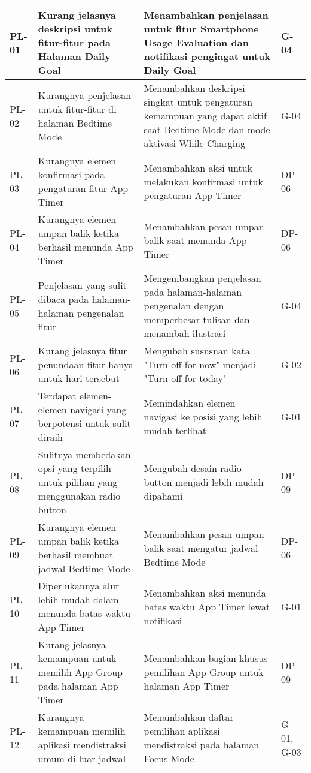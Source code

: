 \begin{footnotesize}
\begin{longtable}[c]{|W{c}{0.06\textwidth}|>{\ccnormspacing}m{0.32\textwidth}|>{\ccnormspacing}m{0.35\textwidth}|>{\ccnormspacingcenter}m{0.14\textwidth}|}
  PL-01 & Kurang jelasnya deskripsi untuk fitur-fitur pada Halaman Daily Goal & Menambahkan penjelasan untuk fitur Smartphone Usage Evaluation dan notifikasi pengingat untuk Daily Goal & G-04 \\ \hline
  PL-02 & Kurangnya penjelasan untuk fitur-fitur di halaman Bedtime Mode & Menambahkan deskripsi singkat untuk pengaturan kemampuan yang dapat aktif saat Bedtime Mode dan mode aktivasi While Charging & G-04 \\ \hline
  PL-03 & Kurangnya elemen konfirmasi pada pengaturan fitur App Timer & Menambahkan aksi untuk melakukan konfirmasi untuk pengaturan App Timer & DP-06 \\ \hline
  PL-04 & Kurangnya elemen umpan balik ketika berhasil menunda App Timer & Menambahkan pesan umpan balik saat menunda App Timer & DP-06 \\ \hline
  PL-05 & Penjelasan yang sulit dibaca pada halaman-halaman pengenalan fitur & Mengembangkan penjelasan pada halaman-halaman pengenalan dengan memperbesar tulisan dan menambah ilustrasi & G-04 \\ \hline
  PL-06 & Kurang jelasnya fitur penundaan fitur hanya untuk hari tersebut & Mengubah sususnan kata "Turn off for now" menjadi "Turn off for today" & G-02 \\ \hline
  PL-07 & Terdapat elemen-elemen navigasi yang berpotensi untuk sulit diraih & Memindahkan elemen navigasi ke posisi yang lebih mudah terlihat & G-01 \\ \hline
  PL-08 & Sulitnya membedakan opsi yang terpilih untuk pilihan yang menggunakan radio button & Mengubah desain radio button menjadi lebih mudah dipahami & DP-09 \\ \hline
  PL-09 & Kurangnya elemen umpan balik ketika berhasil membuat jadwal Bedtime Mode & Menambahkan pesan umpan balik saat mengatur jadwal Bedtime Mode & DP-06 \\ \hline
  PL-10 & Diperlukannya alur lebih mudah dalam menunda batas waktu App Timer & Menambahkan aksi menunda batas waktu App Timer lewat notifikasi & G-01 \\ \hline
  PL-11 & Kurang jelasnya kemampuan untuk memilih App Group pada halaman App Timer & Menambahkan bagian khusus pemilihan App Group untuk halaman App Timer & DP-09 \\ \hline
  PL-12 & Kurangnya kemampuan memilih aplikasi mendistraksi umum di luar jadwal & Menambahkan daftar pemilihan aplikasi mendistraksi pada halaman Focus Mode & G-01, G-03 \\ \hline
  
\end{longtable}
\end{footnotesize}
\justifying
\FloatBarrier



